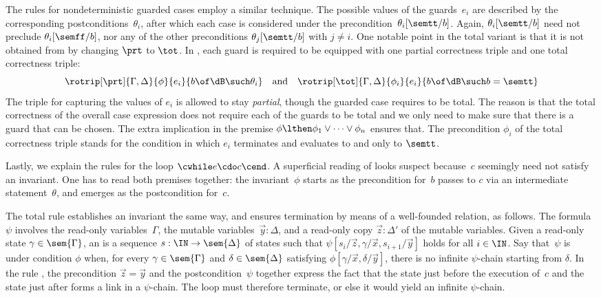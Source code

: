 The rules for nondeterministic guarded cases employ a similar technique. The possible values of the guards~$e_i$ are described by the corresponding postconditions~$\theta_i$, after which each case is considered under the
precondition~$\theta_i[\semtt/b]$. Again, $\theta_i[\semtt/b]$ need not preclude $\theta_i[\semff/b]$, nor any of the other preconditions $\theta_j[\semtt/b]$ with $j \neq i$.
%
One notable point in the total variant  is that it is not obtained from  by changing $\prt$ to $\tot$.
In , each guard is required to be equipped with one partial correctness triple and one total correctness triple:
\[\rotrip[\prt] {\Gamma, \Delta} {\phi} {e_i} {b \of \dB \such \theta_i}
\quad\text{and}\quad
\rotrip[\tot] {\Gamma, \Delta} {\phi_i} {e_i} {b \of \dB \such b = \semtt}
\]
The triple for capturing the values of $e_i$ is allowed to stay \emph{partial}, 
though the guarded case requires to be total. 
The reason is that the total correctness of the overall case expression does not require each of the guards to be total and
we only need to make sure that there is a guard that can be chosen.
The extra implication in the premise 
$\phi \lthen \phi_1 \lor \cdots \lor \phi_n$ ensures that.
The precondition $\phi_i$ of the total correctness triple 
stands for the condition in which $e_i$ terminates and evaluates to and only to $\semtt$. 

Lastly, we explain the rules for the loop $\cwhile e \cdo c \cend$. A superficial reading of  looks suspect because~$c$ seemingly need not satisfy an invariant. One has to read both premises together:  the invariant~$\phi$ starts as the precondition for~$b$ passes to $c$ via an intermediate statement~$\theta$, and emerges as the postcondition for~$c$.

The total rule  establishes an invariant the same way, and ensures termination by means of a well-founded relation, as follows.
%
The formula~$\psi$ involves the read-only variables~$\Gamma$, the mutable variables~$\vec{y} : \Delta$, and a read-only copy $\vec{z} : \Delta'$ of the mutable variables.  Given a read-only state $\gamma \in \sem{\Gamma}$, an  is a sequence $s : \IN \to \sem{\Delta}$ of states such that $\psi[s_i/\vec{z}, \gamma/\vec{x}, s_{i+1}/\vec{y}]$ holds for all $i \in \IN$. Say that~$\psi$ is  under condition $\phi$ when, for every $\gamma \in \sem{\Gamma}$ and $\delta \in \sem{\Delta}$ satisfying $\phi[\gamma/\vec{x}, \delta/\vec{y}]$, there is no infinite $\psi$-chain starting from $\delta$.
%
In the rule ,
%
the precondition $\vec{z} = \vec{y}$ and the postcondition~$\psi$ together express the fact that the state just before the execution of~$c$ and the state just after forms a link in a $\psi$-chain. The loop must therefore terminate, or else it would yield an infinite $\psi$-chain.

